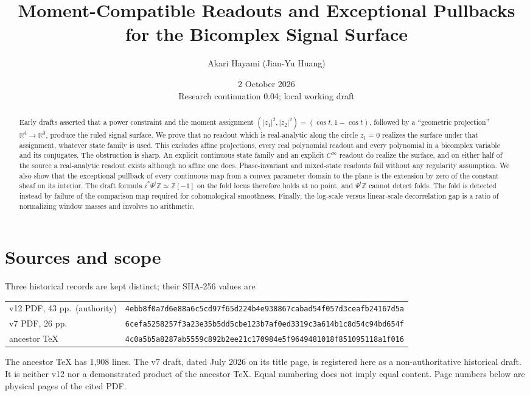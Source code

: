 \documentclass[11pt]{article}
\title{Moment-Compatible Readouts and Exceptional Pullbacks\\
for the Bicomplex Signal Surface}
\author{Akari Hayami (Jian-Yu Huang)}
\date{2 October 2026\\\small Research continuation 0.04; local working draft}
\theoremstyle{definition}\newtheorem{definition}[theorem]{Definition}
\theoremstyle{remark}\newtheorem{remark}[theorem]{Remark}
\newcommand{\R}{\mathbb R}\newcommand{\C}{\mathbb C}\newcommand{\Z}{\mathbb Z}
\begin{document}
\maketitle
\begin{abstract}
Early drafts asserted that a power constraint and the moment assignment
$(|z_1|^2,|z_2|^2)=(\cos t,1-\cos t)$, followed by a ``geometric projection''
$\R^4\to\R^3$, produce the ruled signal surface. We prove that no readout which
is real-analytic along the circle $z_1=0$ realizes the surface under that
assignment, whatever state family is used. This excludes affine projections,
every real polynomial readout and every polynomial in a bicomplex variable and
its conjugates. The obstruction is sharp. An explicit continuous state family
and an explicit $C^\infty$ readout do realize the surface, and on either half of
the source a real-analytic readout exists although no affine one does. Phase-invariant and
mixed-state readouts fail without any regularity assumption. We also show that
the exceptional pullback of every continuous map from a convex parameter domain to the
plane is the extension by zero of the constant sheaf on its interior. The draft
formula $i^*\Psi^!\Z\simeq\Z[-1]$ on the fold locus therefore holds at no
point, and $\Psi^!\Z$ cannot detect folds. The fold is detected instead by
failure of the comparison map required for cohomological smoothness. Finally,
the log-scale versus linear-scale decorrelation gap is a ratio of normalizing
window masses and involves no arithmetic.
\end{abstract}

\section{Sources and scope}\label{sec:scope}
Three historical records are kept distinct; their SHA-256 values are
\begin{center}\footnotesize
\begin{tabular}{@{}ll@{}}
v12 PDF, 43 pp.\ (authority) & \texttt{4ebb8f0a7d6e88a6c5cd97f65d224b4e938867cabad54f057d3ceafb24167d5a}\\
v7 PDF, 26 pp. & \texttt{6cefa5258257f3a23e35b5dd5cbe123b7af0ed3319c3a614b1c8d54c94bd654f}\\
ancestor TeX & \texttt{4c0a5b5a8287ab5559c892b2ee21c170984e5f9649481018f851095118a1f016}
\end{tabular}
\end{center}
The ancestor TeX has 1,908 lines.
The v7 draft, dated July 2026 on its title page, is registered here as a
non-authoritative historical draft. It is neither v12 nor a demonstrated
product of the ancestor TeX. Equal numbering does not imply equal content.
Page numbers below are physical pages of the cited PDF.
\end{document}
